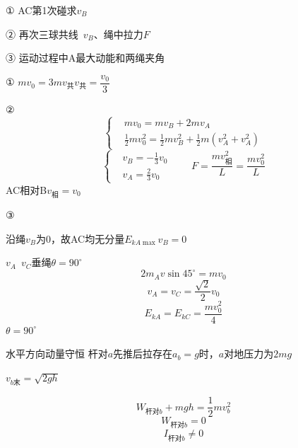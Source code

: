 \begin{problem}

① AC第1次碰\quad 求$v_B$

② 再次三球共线\ $v_B$、绳中拉力$F$

③ 运动过程中A最大动能和两绳夹角
\begin{solution}
① $mv_0=3mv_{\text{共}}$\quad $v_{\text{共}}=\dfrac{v_0}{3}$

② \[
\left\{\begin{aligned}
&mv_0=mv_B+2mv_A\\
&\frac{1}{2}mv_0^2=\frac{1}{2}mv_B^2+\frac{1}{2}m\left(v_A^2+v_A^2\right)
\end{aligned}\right.
\]
\[
\left\{\begin{aligned}
&v_B=-\frac{1}{3}v_0\\
&v_A=\frac{2}{3}v_0
\end{aligned}\right.
\qquad
F=\frac{m v_{\text{相}}^2}{L}=\frac{mv_0^2}{L}
\]
AC相对B\quad $v_{\text{相}}=v_0$

③

沿绳$v_B$为0，故AC均无分量\quad $E_{kA\max}$\quad $v_B=0$

$v_A$\ $v_C$垂绳\quad $\theta=90^\circ$
\[ 2m_Av\sin 45^\circ=mv_0 \]%
\[ v_A=v_C=\frac{\sqrt{2}}{2}v_0 \]
\[ E_{kA}=E_{kC}=\frac{mv_0^2}{4} \]
$\theta=90^\circ$ %
\end{solution}
\end{problem}

水平方向动量守恒
杆对$a$先推后拉\quad 存在$a_b=g$时，$a$对地压力为$2mg$

$v_{b\text{末}}=\sqrt{2gh}$

\[
W_{\text{杆对}b}+mgh=\frac{1}{2}mv_b^2
\]
\[
W_{\text{杆对}b}=0
\]
\[
I_{\text{杆对}b}\neq 0
\]

